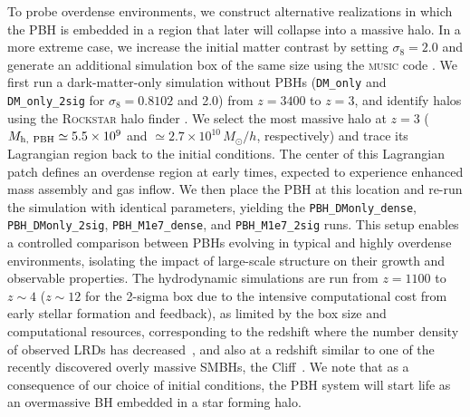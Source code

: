\documentclass[twocolumn,trackchanges]{aastex701}
\begin{document}
To probe overdense environments, we construct alternative realizations in which the PBH is embedded in a region that later will collapse into a massive halo. In a more extreme case, we increase the initial matter contrast by setting $\sigma_8 = 2.0$ and generate an additional simulation box of the same size using the \textsc{music} code \citep{Greif2011ApJ...737...75G,JeonPISN2026ApJ..1001....3J}. We first run a dark-matter-only simulation without PBHs (\texttt{DM\_only} and \texttt{DM\_only\_2sig} for $\sigma_8=0.8102$ and 2.0) from $z = 3400$ to $z = 3$, and identify halos using the \textsc{Rockstar} halo finder \citep{behroozi2012rockstar}. We select the most massive halo at $z = 3$ ($M_{\rm h,\ PBH} \simeq 5.5 \times 10^9$ and $\simeq 2.7 \times 10^{10}\,M_\odot/h$, respectively) and trace its Lagrangian region back to the initial conditions. The center of this Lagrangian patch defines an overdense region at early times, expected to experience enhanced mass assembly and gas inflow. We then place the PBH at this location and re-run the simulation with identical parameters, yielding the \texttt{PBH\_DMonly\_dense},  \texttt{PBH\_DMonly\_2sig}, \texttt{PBH\_M1e7\_dense}, and \texttt{PBH\_M1e7\_2sig} runs. This setup enables a controlled comparison between PBHs evolving in typical and highly overdense environments, isolating the impact of large-scale structure on their growth and observable properties. The hydrodynamic simulations are run from $z
= 1100$ to $z\sim 4$ ($z\sim 12$ for the 2-sigma box due to the intensive computational cost from early stellar formation and feedback), as limited by the box size and computational resources, corresponding to the redshift where the number density of observed LRDs has decreased~\citep[see e.g.,][]{Ma2026LRDApJ}, and also at a redshift similar to one of the recently discovered overly massive SMBHs, the Cliff~\citep[confirmed at $z\simeq 3.5$, see][]{Cliff2025A&A, Cliff2026MNRAS}. %
We note that as a consequence of our choice of initial conditions, the PBH system will start life as an overmassive BH embedded in a star forming halo.
\end{document}
